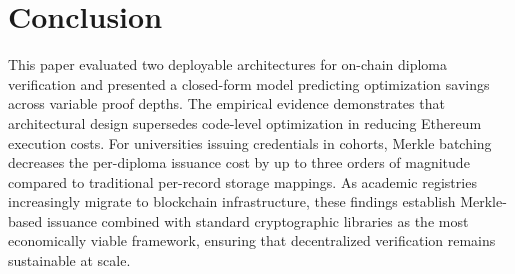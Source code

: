 \documentclass[conference]{IEEEtran}
\begin{document}
\section{Conclusion}
\label{sec:conclusion}

This paper evaluated two deployable architectures for on-chain diploma 
verification and presented a closed-form model predicting optimization 
savings across variable proof depths. The empirical evidence demonstrates 
that architectural design supersedes code-level optimization in reducing 
Ethereum execution costs. For universities issuing credentials in cohorts, 
Merkle batching decreases the per-diploma issuance cost by up to three 
orders of magnitude compared to traditional per-record storage mappings. 
As academic registries increasingly migrate to blockchain infrastructure, 
these findings establish Merkle-based issuance combined with standard 
cryptographic libraries as the most economically viable framework, ensuring 
that decentralized verification remains sustainable at scale.
\end{document}
